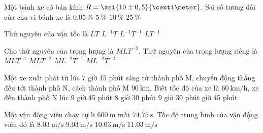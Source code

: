 \begin{ex}
	Một bánh xe có bán kính $R=\xsi{10\pm0,5}{\centi\meter}$. Sai số tương đối của chu vi bánh xe là
	\choice
	{$\SI{0.05}{\percent}$}
	{\True $\SI{5}{\percent}$}
	{$\SI{10}{\percent}$}
	{$\SI{25}{\percent}$}
\end{ex}
\begin{ex}
	Thứ nguyên của vận tốc là
	\choice
	{$LT$}
	{$L^{-1}T$}
	{$L^{-1}T^{-1}$}
	{\True $LT^{-1}$}
\end{ex}
\begin{ex}
	Cho thứ nguyên của trọng lượng là $MLT^{-2}$. Thứ nguyên của trọng lượng riêng là
	\choice
	{$MLT^{-1}$}
	{$MLT^{-2}$}
	{$ML^{-2}T^{-1}$}
	{\True $ML^{-2}T^{-2}$}
\end{ex}
\begin{ex}
	Một xe xuất phát từ lúc 7 giờ 15 phút sáng từ thành phố M, chuyển động thẳng đều tới thành phố N, cách thành phố M $\SI{90}{\kilo\meter}$. Biết tốc độ của xe là $\SI{60}{\kilo\meter/\hour}$, xe đến thành phố N lúc	
	\choice
	{9 giờ 45 phút}
	{8 giờ 30 phút}
	{9 giờ 30 phút}
	{ giờ 45 phút}
\end{ex}
\begin{ex}
	Một vận động viên chạy cự li $\SI{600}{\meter}$ mất $\SI{74.75}{\second}$. Tốc độ trung bình của vận động viên đó là
	\choice
	{\True $\SI{8.03}{\meter/\second}$}
	{$\SI{9.03}{\meter/\second}$}
	{$\SI{10.03}{\meter/\second}$}
	{$\SI{11.03}{\meter/\second}$}
\end{ex}
